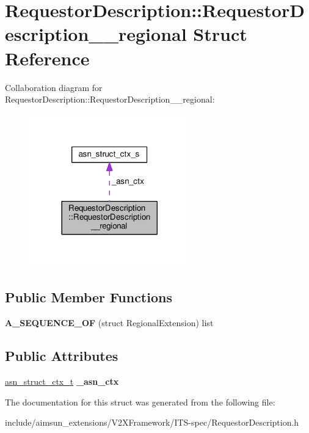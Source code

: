 \hypertarget{structRequestorDescription_1_1RequestorDescription____regional}{}\section{Requestor\+Description\+:\+:Requestor\+Description\+\_\+\+\_\+regional Struct Reference}
\label{structRequestorDescription_1_1RequestorDescription____regional}


Collaboration diagram for Requestor\+Description\+:\+:Requestor\+Description\+\_\+\+\_\+regional\+:\nopagebreak
\begin{figure}[H]
\begin{center}
\leavevmode
\includegraphics[width=197pt]{structRequestorDescription_1_1RequestorDescription____regional__coll__graph}
\end{center}
\end{figure}
\subsection*{Public Member Functions}
\begin{DoxyCompactItemize}
\item 
{\bfseries A\+\_\+\+S\+E\+Q\+U\+E\+N\+C\+E\+\_\+\+OF} (struct Regional\+Extension) list\hypertarget{structRequestorDescription_1_1RequestorDescription____regional_ada473c05c09621a999c08f90bbc64619}{}\label{structRequestorDescription_1_1RequestorDescription____regional_ada473c05c09621a999c08f90bbc64619}

\end{DoxyCompactItemize}
\subsection*{Public Attributes}
\begin{DoxyCompactItemize}
\item 
\hyperlink{structasn__struct__ctx__s}{asn\+\_\+struct\+\_\+ctx\+\_\+t} {\bfseries \+\_\+asn\+\_\+ctx}\hypertarget{structRequestorDescription_1_1RequestorDescription____regional_a4edfb069e0bf012f00185187c105d39d}{}\label{structRequestorDescription_1_1RequestorDescription____regional_a4edfb069e0bf012f00185187c105d39d}

\end{DoxyCompactItemize}


The documentation for this struct was generated from the following file\+:\begin{DoxyCompactItemize}
\item 
include/aimsun\+\_\+extensions/\+V2\+X\+Framework/\+I\+T\+S-\/spec/Requestor\+Description.\+h\end{DoxyCompactItemize}
